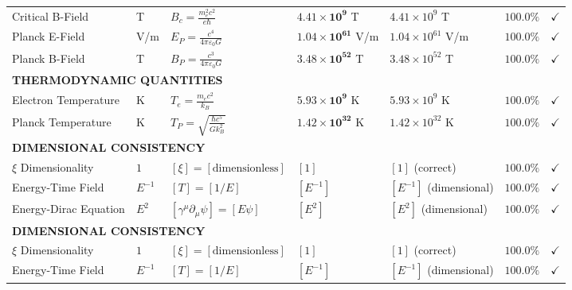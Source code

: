 \documentclass[12pt,a4paper]{article}
\newcommand{\xipar}{\xi}
\newcommand{\checked}{\checkmark}
\begin{document}
\begin{landscape}
\begin{longtable}{p{5.8cm}p{2cm}p{4.2cm}p{3.8cm}p{3.8cm}p{2.0cm}p{1cm}}
			Critical B-Field & T & $B_c = \frac{m_e^2 c^2}{e\hbar}$ & $\mathbf{4.41 \times 10^{9}}$ T & $4.41 \times 10^{9}$ T & $\mathbf{100.0\%}$ & $\checked$ \\
			
			Planck E-Field & V/m & $E_P = \frac{c^4}{4\pi\varepsilon_0 G}$ & $\mathbf{1.04 \times 10^{61}}$ V/m & $1.04 \times 10^{61}$ V/m & $\mathbf{100.0\%}$ & $\checked$ \\
			
			Planck B-Field & T & $B_P = \frac{c^3}{4\pi\varepsilon_0 G}$ & $\mathbf{3.48 \times 10^{52}}$ T & $3.48 \times 10^{52}$ T & $\mathbf{100.0\%}$ & $\checked$ \\
			
			\multicolumn{7}{l}{\textbf{THERMODYNAMIC QUANTITIES}} \\
			\midrule
			Electron Temperature & K & $T_e = \frac{m_e c^2}{k_B}$ & $\mathbf{5.93 \times 10^{9}}$ K & $5.93 \times 10^{9}$ K & $\mathbf{100.0\%}$ & $\checked$ \\
			
			Planck Temperature & K & $T_P = \sqrt{\frac{\hbar c^5}{G k_B^2}}$ & $\mathbf{1.42 \times 10^{32}}$ K & $1.42 \times 10^{32}$ K & $\mathbf{100.0\%}$ & $\checked$ \\
			
			\multicolumn{7}{l}{\textbf{DIMENSIONAL CONSISTENCY}} \\
			\midrule
			$\xipar$ Dimensionality & $1$ & $[\xipar] = [\text{dimensionless}]$ & $[1]$ & $[1]$ (correct) & $\mathbf{100.0\%}$ & $\checked$ \\
			
			Energy-Time Field & $E^{-1}$ & $[T] = [1/E]$ & $[E^{-1}]$ & $[E^{-1}]$ (dimensional) & $\mathbf{100.0\%}$ & $\checked$ \\
			
			Energy-Dirac Equation & $E^2$ & $[\gamma^{\mu}\partial_{\mu}\psi] = [E\psi]$ & $[E^2]$ & $[E^2]$ (dimensional) & $\mathbf{100.0\%}$ & $\checked$ \\
			\multicolumn{7}{l}{\textbf{DIMENSIONAL CONSISTENCY}} \\
			\midrule
			$\xipar$ Dimensionality & $1$ & $[\xipar] = [\text{dimensionless}]$ & $[1]$ & $[1]$ (correct) & $\mathbf{100.0\%}$ & $\checked$ \\
			
			Energy-Time Field & $E^{-1}$ & $[T] = [1/E]$ & $[E^{-1}]$ & $[E^{-1}]$ (dimensional) & $\mathbf{100.0\%}$ & $\checked$ \\
			

\end{longtable}
\end{landscape}
\end{document}

